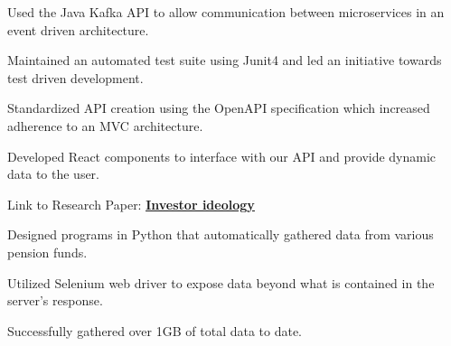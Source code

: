 \documentclass[letterpaper]{deedy-resume}
\begin{document}
\begin{minipage}[t]{0.66\textwidth}
\begin{tightitemize}
\item Used the Java Kafka API to allow communication between microservices in an event driven architecture.
\item Maintained an automated test suite using Junit4 and led an initiative towards test driven development.
\item Standardized API creation using the OpenAPI specification which increased adherence to an MVC architecture.
\item Developed React components to interface with our API and provide dynamic data to the user.
\end{tightitemize}

\sectionspace


Link to Research Paper: \href{https://www.sciencedirect.com/science/article/abs/pii/S0304405X20300635}{\underline{\textbf{Investor ideology}}}
\begin{tightitemize}
\item Designed programs in Python that automatically gathered data from various pension funds.
\vspace{3pt}
\item Utilized Selenium web driver to expose data beyond what is contained in the server's response.
\vspace{3pt}
\item Successfully gathered over 1GB of total data to date.

\end{tightitemize}




\end{minipage}
\end{document}
